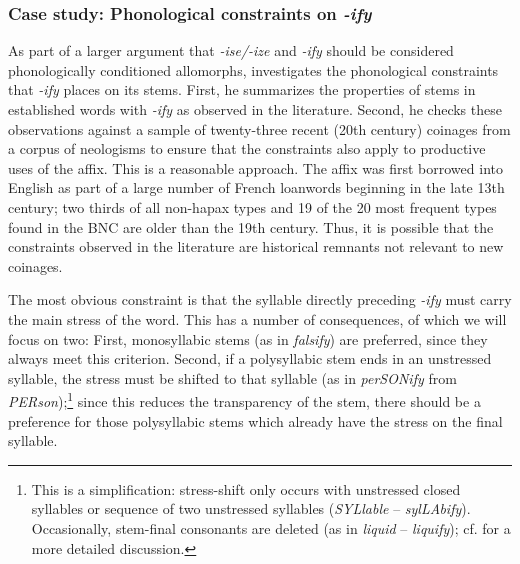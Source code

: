 \subsubsection{Case study: Phonological constraints on \textit{-ify}}
\label{sec:phonologicalconstraintsofify}

As part of a larger argument that \textit{-ise/-ize} and \textit{-ify} should be considered phonologically conditioned allomorphs, \citet{plag_morphological_1999} investigates the phonological constraints that \textit{-ify} places on its stems.  First, he summarizes the properties of stems in established words with \textit{-ify} as observed in the literature. Second, he checks these observations against a sample of twenty\hyp{}three recent (20th century) coinages from a corpus of neologisms  to ensure that the constraints also apply to productive  uses of the affix.  This is a reasonable approach. The affix  was first borrowed into English as part of a large number of French loanwords beginning in the late 13th century; two thirds of all non\hyp{}hapax  types  and 19 of the 20 most frequent types found in the BNC  are older than the 19th century. Thus, it is possible that the constraints observed in the literature are historical remnants not relevant to new coinages.

The most obvious constraint is that the syllable  directly preceding \textit{-ify} must carry the main stress of the word. This has a number of consequences, of which we will focus on two: First, monosyllabic stems  (as in \textit{falsify}) are preferred, since they always meet this criterion. Second, if a polysyllabic stem ends in an unstressed syllable, the stress must be shifted to that syllable (as in \textit{perSONify} from \textit{PERson});\footnote{This is a simplification: stress\hyp{}shift only occurs with unstressed closed syllables or sequence of two unstressed syllables  (\textit{SYLlable} -- \textit{sylLAbify}). Occasionally, stem\hyp{}final  consonants  are deleted (as in \textit{liquid} -- \textit{liquify}); cf. \citet{plag_morphological_1999} for a more detailed discussion.} since this reduces the transparency of the stem, there should be a preference for those polysyllabic stems  which already have the stress on the final  syllable.

